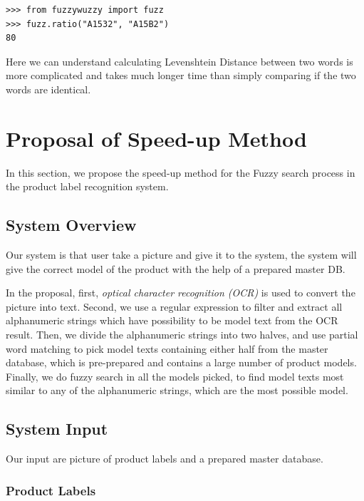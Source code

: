 \documentclass[technicalreport]{ieicej}
\begin{document}
        \begin{lstlisting}
>>> from fuzzywuzzy import fuzz
>>> fuzz.ratio("A1532", "A15B2")
80      \end{lstlisting}


        Here we can understand calculating Levenshtein Distance between two words is more complicated and takes much longer time than simply comparing if the two words are identical.


\section{Proposal of Speed-up Method}
\label{sec:proposal}
    In this section, we propose the speed-up method for the Fuzzy search process in the product label recognition system.

    \subsection{System Overview}
        Our system is that user take a picture and give it to the system, the system will give the correct model of the product with the help of a prepared master DB.

        In the proposal, first, {\em optical character recognition (OCR)} is used to convert the picture into text. Second, we use a regular expression to filter and extract all alphanumeric strings which have possibility to be model text from the OCR result. Then, we divide the alphanumeric strings into two halves, and use partial word matching to pick model texts containing either half from the master database, which is pre-prepared and contains a large number of product models. Finally, we do fuzzy search in all the models picked, to find model texts most similar to any of the alphanumeric strings, which are the most possible model. 
        
    \subsection{System Input}
    \label{sec:algorithm.ocrregex}
        Our input are picture of product labels and a prepared master database.

        \subsubsection{Product Labels}
        \label{sec:label-request}
\end{document}
